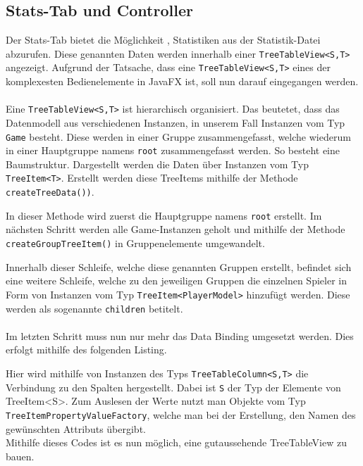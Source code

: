 \subsection{Stats-Tab und Controller}\label{sssec:statsController}
Der Stats-Tab bietet die Möglichkeit , Statistiken aus der Statistik-Datei abzurufen.
Diese genannten Daten werden innerhalb einer \lstinline[style=java]{TreeTableView<S,T>} angezeigt.
Aufgrund der Tatsache, dass eine \lstinline[style=java]{TreeTableView<S,T>} eines der komplexesten Bedienelemente in JavaFX ist, soll nun darauf eingegangen werden.\\\\
Eine \lstinline[style=java]{TreeTableView<S,T>} ist hierarchisch organisiert.
Das beutetet, dass das Datenmodell aus verschiedenen Instanzen, in unserem Fall Instanzen vom Typ \lstinline[style=java]{Game} besteht.
Diese werden in einer Gruppe zusammengefasst, welche wiederum in einer Hauptgruppe namens \lstinline[style=java]{root} zusammengefasst werden.
So besteht eine Baumstruktur.
Dargestellt werden die Daten über Instanzen vom Typ \lstinline[style=java]{TreeItem<T>}.
Erstellt werden diese TreeItems mithilfe der Methode \lstinline[style=java]{createTreeData())}.

In dieser Methode wird zuerst die Hauptgruppe namens \lstinline[style=java]{root} erstellt.
Im nächsten Schritt werden alle Game-Instanzen geholt und mithilfe der Methode \lstinline[style=java]{createGroupTreeItem()} in Gruppenelemente umgewandelt.

Innerhalb dieser Schleife, welche diese genannten Gruppen erstellt, befindet sich eine weitere Schleife, welche zu den jeweiligen Gruppen die einzelnen Spieler in Form von Instanzen vom Typ \lstinline[style=java]{TreeItem<PlayerModel>} hinzufügt werden.
Diese werden als sogenannte \lstinline[style=java]{children} betitelt.\\\\
Im letzten Schritt muss nun nur mehr das Data Binding umgesetzt werden.
Dies erfolgt mithilfe des folgenden Listing.

Hier wird mithilfe von Instanzen des Typs \lstinline[style=java]{TreeTableColumn<S,T>} die Verbindung zu den Spalten hergestellt.
Dabei ist \lstinline[style=java]{S} der Typ der Elemente von {TreeItem<S>}.
Zum Auslesen der Werte nutzt man Objekte vom Typ \lstinline[style=java]{TreeItemPropertyValueFactory}, welche man bei der Erstellung, den Namen des gewünschten Attributs übergibt.\\
Mithilfe dieses Codes ist es nun möglich, eine gutaussehende TreeTableView zu bauen.
